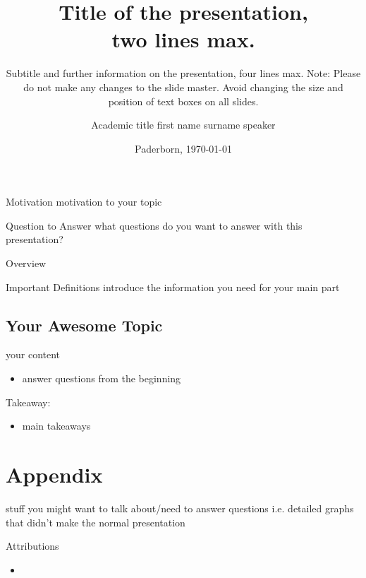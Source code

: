 \documentclass[
]{upbbeamer2023}
\title{Title of the presentation,\\two lines max.}
\subtitle{Subtitle and further information on the presentation, four lines max. Note: Please do not make any changes to the slide master. Avoid changing the size and position of text boxes on all slides.}
\institute{Research Group XYZ}
\author{Academic title first name surname speaker}
\date{Paderborn, \today}
\begin{document}
\begin{frame}[preface]{Motivation}
    motivation to your topic
\end{frame}

\begin{frame}[preface]{Question to Answer}
    what questions do you want to answer with this presentation?
\end{frame}

\begin{frame}[preface]{Overview}
    \tableofcontents
\end{frame}


\begin{frame}{Important Definitions}
    introduce the information you need for your main part
\end{frame}


\subsection{Your Awesome Topic}

\begin{frame}{\subsecname}
    your content
\end{frame}

\begin{frame}{\phantom{X}}

\end{frame}


\begin{frame}{\secname}
    \begin{itemize}
        \item answer questions from the beginning
    \end{itemize}
    \vspace*{1em}
    Takeaway:
    \begin{itemize}
        \item main takeaways
    \end{itemize}
\end{frame}

\section*{Appendix}\sectionframe

\begin{frame}{\secname}
    stuff you might want to talk about/need to answer questions
    i.e. detailed graphs that didn't make the normal presentation
\end{frame}

\begin{frame}{Attributions}
\begin{itemize}
    \item 
\end{itemize}
\end{frame}
\end{document}
